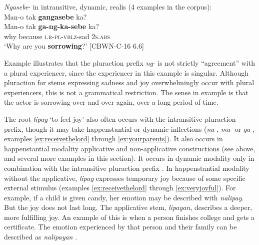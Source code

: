 \ea
\textit{Ngasebe}- in intransitive, dynamic, realis (4 examples in the corpus): \\
\label{bkm:Ref123572729}
Man-o  tak  \textbf{gangasebe}  ka? \\\smallskip
\gll Man-o  tak  \textbf{ga-ng-ka-sebe}  ka? \\
why  because  \textsc{i.r}-\textsc{pl}-\textsc{vblz}-sad  2\textsc{s.abs} \\
\glt ‘Why are you \textbf{sorrowing}?’ [CBWN-C-16 6.6]
\z

Example  illustrates that the pluraction prefix \textit{ng}{}- is not strictly “agreement” with a plural experiencer, since the experiencer in this example is singular. Although pluraction for stems expressing sadness and joy overwhelmingly occur with plural experiencers, this is not a grammatical restriction. The sense in example  is that the actor is sorrowing over and over again, over a long period of time.

The root \textit{lipay} ‘to feel joy’ also often occurs with the intransitive pluraction prefix, though it may take happenstantial or dynamic inflections (\textit{na}-, \textit{ma}- or \textit{ga}-, examples \ref{ex:receivethelord} through \ref{ex:yourparents}). It also occurs in happenstantial modality applicative and non-applicative constructions (see  above, and several more examples in this section). It occurs in dynamic modality only in combination with the intransitive pluraction prefix . In happenstantial modality without the applicative, \textit{lipay} expresses temporary joy because of some specific external stimulus (examples \ref{ex:receivethelord} through \ref{ex:veryjoyful}). For example, if a child is given candy, her emotion may be described with \textit{nalipay}. But the joy does not last long. The applicative stem, \textit{lipayan}, describes a deeper, more fulfilling joy. An example of this is when a person finishes college and gets a certificate. The emotion experienced by that person and their family can be described as \textit{nalipayan} .

